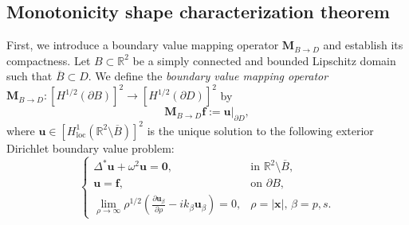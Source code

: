 \documentclass[11pt,reqno,twoside]{amsart}
\theoremstyle{definition}
\theoremstyle{remark}
\numberwithin{equation}{section}
\begin{document}
\subsection{Monotonicity shape characterization theorem}
First, we introduce a boundary value mapping operator $\mathbf{M}_{B \to D}$ and establish its compactness. Let $B \subset \mathbb{R}^2$ be a simply connected and bounded Lipschitz domain such that $\overline{B} \subset D$. We define the \emph{boundary value mapping operator} $\mathbf{M}_{B \to D} : [H^{1/2}(\partial B)]^2 \to [H^{1/2}(\partial D)]^2$ by
\begin{equation*}%
    \mathbf{M}_{B \to D} \mathbf{f} := \mathbf{u}|_{\partial D},
\end{equation*}
where $\mathbf{u} \in [H^1_{\mathrm{loc}}(\mathbb{R}^2 \setminus \overline{B})]^2$ is the unique solution to the following exterior Dirichlet boundary value problem:
\begin{equation}\label{eq:ueq}
    \begin{cases}
        \Delta^* \mathbf{u} + \omega^2 \mathbf{u} = \mathbf{0}, & \text{in } \mathbb{R}^2 \setminus \overline{B}, \\
        \mathbf{u} = \mathbf{f}, & \text{on } \partial B, \\
        \lim\limits_{\rho \to \infty} \rho^{1/2} \left( \frac{\partial \mathbf{u}_\beta}{\partial \rho} - i k_\beta \mathbf{u}_\beta \right) = 0, & \rho = |\mathbf{x}|, \, \beta = p, s.
    \end{cases}
\end{equation}
\end{document}
